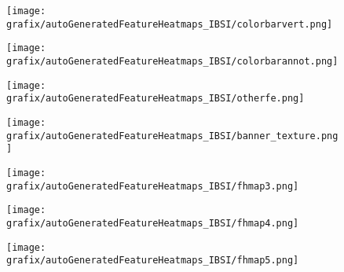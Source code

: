 \hspace{5px} 
\begin{subfigure}{\wid\textwidth} 
    \texttt{[image: grafix/autoGeneratedFeatureHeatmaps\_IBSI/colorbarvert.png]} 
\end{subfigure} 
\begin{subfigure}{\wid\textwidth} 
    \texttt{[image: grafix/autoGeneratedFeatureHeatmaps\_IBSI/colorbarannot.png]} 
\end{subfigure} 
\begin{subfigure}{\wid\textwidth} 
    \texttt{[image: grafix/autoGeneratedFeatureHeatmaps\_IBSI/otherfe.png]} 
\end{subfigure} 
\hspace{10px} 
\begin{subfigure}{\wid\textwidth} 
    \texttt{[image: grafix/autoGeneratedFeatureHeatmaps\_IBSI/banner\_texture.png]} 
\end{subfigure} 
\hspace{\hsp} 
\begin{subfigure}{\wid\textwidth} 
    \centering 
    \caption{\small \sffamily {}} 
\end{subfigure} 
\hspace{\hsp} 
\begin{subfigure}{\wid\textwidth} 
    \centering 
    \caption{\tiny \sffamily {}} 
    \vspace{\vsp} 
    \texttt{[image: grafix/autoGeneratedFeatureHeatmaps\_IBSI/fhmap3.png]} 
\end{subfigure} 
\hspace{\hsp} 
\begin{subfigure}{\wid\textwidth} 
    \centering 
    \caption{\tiny \sffamily {}} 
    \vspace{\vsp} 
    \texttt{[image: grafix/autoGeneratedFeatureHeatmaps\_IBSI/fhmap4.png]} 
\end{subfigure} 
\hspace{\hsp} 
\begin{subfigure}{\wid\textwidth} 
    \centering 
    \caption{\tiny \sffamily {}} 
    \vspace{\vsp} 
    \texttt{[image: grafix/autoGeneratedFeatureHeatmaps\_IBSI/fhmap5.png]} 
\end{subfigure} 
